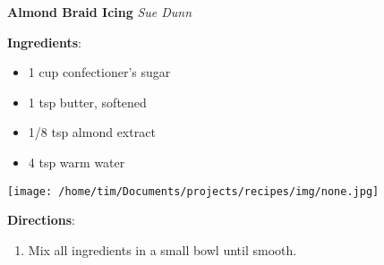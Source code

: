 \documentclass[11pt, twoside, openany]{book}
\begin{document}
\noindent\begin{minipage}[t]{\linewidth}%
{\Large\textbf{Almond Braid Icing}} \label{almond-braid-icing}\hfill\textit{Sue Dunn}\\
\noindent\begin{minipage}[t]{0.78\linewidth}%
\textbf{Ingredients}:\vspace{-3mm}
\begin{multicols}{2}
\begin{itemize}\setlength\itemsep{-1mm}
\item 1 cup confectioner's sugar
\item 1 tsp butter, softened
\item 1/8 tsp almond extract
\item 4 tsp warm water
\end{itemize}
\end{multicols}
\end{minipage}
\noindent\begin{minipage}[t]{0.18\linewidth}
\centering \strut\vspace*{-\baselineskip}\newline
\texttt{[image: /home/tim/Documents/projects/recipes/img/none.jpg]}\\
\end{minipage}\vspace{3mm}
\textbf{Directions}:
\vspace{-3mm}\begin{enumerate}\setlength\itemsep{-1mm}
\item Mix all ingredients in a small bowl until smooth.
\end{enumerate}
\end{minipage}\vspace{8mm}
\end{document}
